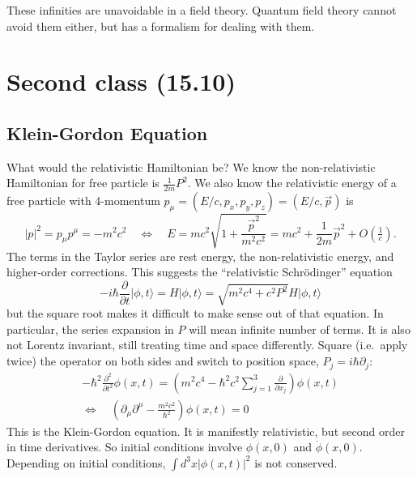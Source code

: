\documentclass[12pt]{article}
\begin{document}
These infinities are unavoidable in a field theory. Quantum field
theory cannot avoid them either, but has a formalism for dealing with
them.


\section{Second class (15.10)}

\subsection{Klein-Gordon Equation}

What would the relativistic Hamiltonian be? We know the
non-relativistic Hamiltonian for free particle is
$\frac{1}{2m}P^2$. We also know the relativistic energy of a free
particle with 4-momentum $p_\mu = (E/c, p_x, p_y, p_z) = (E/c,
\vec{p})$ is
\begin{equation}
  |p|^2 = p_\mu p^\mu = -m^2 c^2
  \quad \Leftrightarrow \quad
  E = mc^2 \sqrt{1 + \frac{\vec{p}^2}{m^2 c^2}} =
  mc^2 + \frac{1}{2m} \vec{p}^2 
  + O(\tfrac{1}{c}).
\end{equation}
The terms in the Taylor series are rest energy, the non-relativistic
energy, and higher-order corrections. This suggests the ``relativistic
Schr\"odinger'' equation
\begin{equation}
  -i\hbar \frac{\partial}{\partial t} |\phi, t\rangle =
  H |\phi, t\rangle =
  \sqrt{m^2c^4 + c^2 P^2}
  H |\phi, t\rangle
\end{equation}
but the square root makes it difficult to make sense out of that
equation. In particular, the series expansion in $P$ will mean
infinite number of terms. It is also not Lorentz invariant, still
treating time and space differently. Square (i.e.~apply twice) the
operator on both sides and switch to position space,
$P_j=i\hbar \partial_j$:
\begin{equation}
  \begin{gathered}
    -\hbar^2 \frac{\partial^2}{\partial t^2} \phi(x, t) 
    =
    \left(
      m^2c^4  - \hbar^2 c^2 \sum_{j=1}^3 \frac{\partial}{\partial x_j}
    \right) \phi(x,t)
    \\
    \Leftrightarrow \quad
    \left(
      \partial_\mu \partial^\mu  -
      \frac{m^2 c^2}{\hbar^2}
    \right) \phi(x,t) = 0
  \end{gathered}
\end{equation}
This is the Klein-Gordon equation. It is manifestly relativistic, but
second order in time derivatives. So initial conditions involve
$\phi(x,0)$ and $\dot\phi(x,0)$. Depending on initial conditions,
$\int d^3x |\phi(x,t)|^2$ is not conserved.
\end{document}
